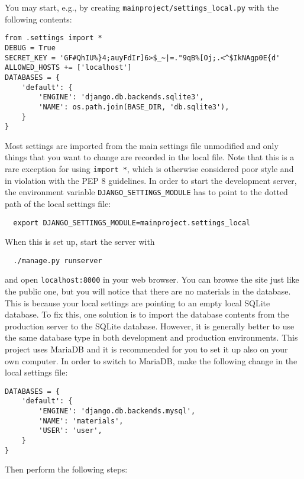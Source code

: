 \documentclass{article}
\begin{document}
You may start, e.g., by creating \verb+mainproject/settings_local.py+ with the following contents:
\lstset{language=Python}
\begin{lstlisting}
from .settings import *
DEBUG = True
SECRET_KEY = 'GF#QhIU%}4;auyFdIr]6>$_~|=."9qB%[Oj;.<^$IkNAgp0E{d'
ALLOWED_HOSTS += ['localhost']
DATABASES = {
    'default': {
        'ENGINE': 'django.db.backends.sqlite3',
        'NAME': os.path.join(BASE_DIR, 'db.sqlite3'),
    }
}
\end{lstlisting}
Most settings are imported from the main settings file unmodified and only things that you want to change are recorded in the local file. Note that this is a rare exception for using \verb+import *+, which is otherwise considered poor style and in violation with the PEP 8 guidelines. In order to start the development server, the environment variable \verb+DJANGO_SETTINGS_MODULE+ has to point to the dotted path of the local settings file:
\lstset{language=Bash}
\begin{lstlisting}
  export DJANGO_SETTINGS_MODULE=mainproject.settings_local
\end{lstlisting}
When this is set up, start the server with
\begin{lstlisting}
  ./manage.py runserver
\end{lstlisting}
and open \verb+localhost:8000+ in your web browser. You can browse the site just like the public one, but you will notice that there are no materials in the database. This is because your local settings are pointing to an empty local SQLite database. To fix this, one solution is to import the database contents from the production server to the SQLite database. However, it is generally better to use the same database type in both development and production environments. This project uses MariaDB and it is recommended for you to set it up also on your own computer. In order to switch to MariaDB, make the following change in the local settings file:
\lstset{language=Python}
\begin{lstlisting}
DATABASES = {
    'default': {
        'ENGINE': 'django.db.backends.mysql',
        'NAME': 'materials',
        'USER': 'user',
    }
}
\end{lstlisting}
Then perform the following steps:
\end{document}
